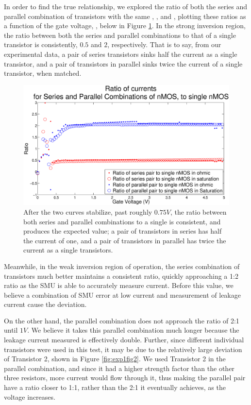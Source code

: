 In order to find the true relationship, we explored the ratio of both the series and parallel combination of \nMOS transistors with the same \Vg, \Vd, \Vs and \Vb, plotting these ratios as a function of the gate voltage, \Vg, below in Figure \ref{fig:exp2ratios}. 
In the strong inversion region, the ratio between both the series and parallel combinations to that of a single transistor is consistently, $0.5$ and $2$, respectively. That is to say, from our experimental data, a pair of series transistors sinks half the current as a single transistor, and a pair of transistors in parallel sinks twice the current of a single transistor, when matched.

\begin{figure}[H]
\centering
\includegraphics[width=\linewidth]{../Figures/Experiment2Ratios.eps}
\caption{After the two curves stabilize, past roughly $0.75V$, the ratio between both series and parallel combinations to a single \nMOS is consistent, and produces the expected value; a pair of \nMOS transistors in series has half the current of one, and a pair of \nMOS transistors in parallel has twice the current as a single transistors.}
\label{fig:exp2ratios}
\end{figure}

Meanwhile, in the weak inversion region of operation, the series combination of transistors much better maintains a consistent ratio, quickly approaching a 1:2 ratio as the SMU is able to accurately measure current. Before this value, we believe a combination of SMU error at low current and measurement of leakage current cause the deviation. 


On the other hand, the parallel combination does not approach the ratio of 2:1 until $1V$. We believe it takes this parallel combination much longer because the leakage current measured is effectively double. Further, since different individual transistors were used in this test, it may be due to the relatively large deviation of Transistor 2, shown in Figure \ref{fig:exp1fig2}. We used Transistor 2 in the parallel combination, and since it had a higher strength factor than the other three resistors, more current would flow through it, thus making the parallel pair have a ratio closer to 1:1, rather than the 2:1 it eventually achieves, as the voltage increases.



